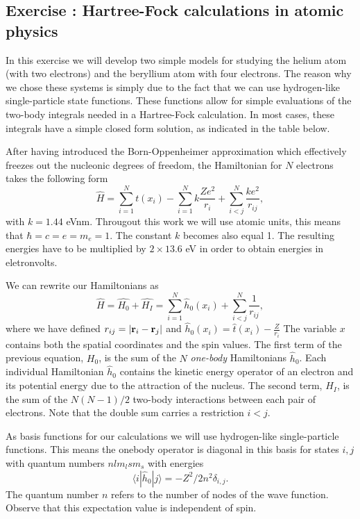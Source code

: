 \documentclass[%
oneside,                 %
final,                   %
10pt]{article}
\newenvironment{doconceexercise}{}{}
\newcounter{doconceexercisecounter}
\begin{document}
\begin{doconceexercise}

\subsection*{Exercise \thedoconceexercisecounter: Hartree-Fock calculations in atomic physics}


In this exercise we will develop two simple models for studying the 
helium atom (with two electrons) and the beryllium atom with four electrons.
The reason why we chose these systems is simply due to the fact that we can use
hydrogen-like single-particle state functions. These functions allow for simple evaluations of the two-body integrals needed in a Hartree-Fock calculation. 
In most cases, these integrals have a simple closed form solution, as indicated in the table below.

After having introduced the  Born-Oppenheimer approximation which effectively freezes out the nucleonic degrees
of freedom, the Hamiltonian for $N$ electrons takes the following form 
\[
  \hat{H} = \sum_{i=1}^{N} t(x_i) 
  - \sum_{i=1}^{N} k\frac{Ze^2}{r_i} + \sum_{i<j}^{N} \frac{ke^2}{r_{ij}},
\]
with $k=1.44$ eVnm. Througout this work we will use atomic units, this means
that $\hbar=c=e=m_e=1$. The constant $k$ becomes also equal 1. 
The resulting energies have to be multiplied by $2\times 13.6$ eV
in order to obtain energies in eletronvolts.

 We can rewrite our Hamiltonians as
\[
    \hat{H} = \hat{H_0} + \hat{H_I} 
    = \sum_{i=1}^{N}\hat{h}_0(x_i) + \sum_{i < j}^{N}\frac{1}{r_{ij}},
\]
where  we have defined $r_{ij}=| {\bf r}_i-{\bf r}_j|$ and
$\hat{h}_0(x_i) =  \hat{t}(x_i) - \frac{Z}{r_i}$
The variable $x$ contains both the spatial coordinates and the spin values.
The first term of the previous equation, $H_0$, is the sum of the $N$ \emph{one-body} Hamiltonians $\hat{h}_0$. Each individual
Hamiltonian $\hat{h}_0$ contains the kinetic energy operator of an
electron and its potential energy due to the attraction of the
nucleus. The second term, $H_I$, is the sum of the $N(N-1)/2$
two-body interactions between each pair of electrons. Note that the double sum carries a restriction $i<j$.

As basis functions for our calculations we will use hydrogen-like single-particle functions.  This means the onebody operator is diagonal in this basis for states $i,j$ with quantum numbers $nlm_lsm_s$ with  
energies 
\[\langle i|\hat{h}_0| j\rangle =  -Z^2/2n^2\delta_{i,j}.
\]  
The quantum number $n$ refers to the number of nodes 
of the wave function.  Observe that this expectation value is independent of spin.


\end{doconceexercise}
\end{document}
